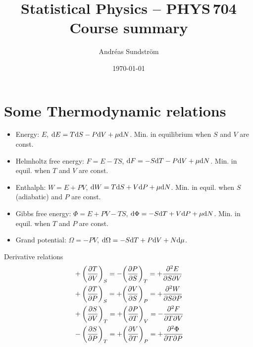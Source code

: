 \documentclass[11pt,letter, swedish, english, twocolumn
]{article}
\begin{document}




\title{\vspace{-1.5cm}Statistical Physics -- PHYS\,704 \\
Course summary}
\author{Andréas Sundström}
\date{\today}

\maketitle

\tableofcontents
\newpage


\section{Some Thermodynamic relations}

\begin{itemize}
\item Energy: $E$, $\mathrm{d} E = T\mathrm{d} S - P\mathrm{d} V + \mu\mathrm{d} N$.
Min. in equilibrium when $S$ and $V$ are const.
\item Helmholtz free energy: $F=E-TS$, $\mathrm{d} F = -S\mathrm{d} T - P\mathrm{d} V + \mu\mathrm{d} N$.
Min. in equil. when $T$ and $V$ are const.
\item Enthalph: $W=E+PV$, $\mathrm{d} W = T\mathrm{d} S + V\mathrm{d} P + \mu\mathrm{d} N$.
Min. in equil. when $S$ (adiabatic) and $P$ are const.
\item Gibbs free energy: $\Phi=E+PV-TS$, $\mathrm{d}\Phi = -S\mathrm{d} T + V\mathrm{d} P + \mu\mathrm{d} N$.
Min. in equil. when $T$ and $P$ are const.
\item Grand potential: $\Omega=-PV$, $\mathrm{d}\Omega = -S\mathrm{d} T + P\mathrm{d} V + N\mathrm{d}\mu$.
\end{itemize}

Derivative relations
\begin{equation}
\begin{aligned}
&+\qty(\pdv{T}{V})_S=-\qty(\pdv{P}{S})_T=+\pdv[2]{E}{S}{V}\\
&+\qty(\pdv{T}{P})_S=+\qty(\pdv{V}{S})_P=+\pdv[2]{W}{S}{P}\\
&+\qty(\pdv{S}{V})_T=+\qty(\pdv{P}{T})_V=-\pdv[2]{F}{T}{V}\\
&-\qty(\pdv{S}{P})_T=+\qty(\pdv{V}{T})_P=+\pdv[2]{\Phi}{T}{P}\\
\end{aligned}
\end{equation}
\end{document}
